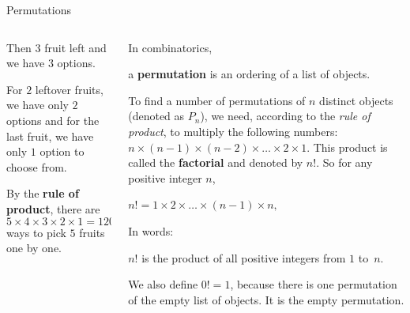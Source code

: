 \documentclass[9pt,aspectratio=169]{beamer}
\begin{document}
\begin{frame}{Permutations}
\begin{columns}[T]
\begin{column}{0.5\textwidth}
      Then $3$ fruit left and we have $3$ options. 
      
      For $2$ leftover fruits, we have only $2$ options and for the last fruit, we have only $1$ option to choose from.

      By the \textbf{rule of product}, there are
      \[5 \times 4 \times 3 \times 2 \times 1 = 120\]
      ways to pick $5$ fruits one by one. 
    \end{column}
    \begin{column}{0.5\textwidth}
      In combinatorics, 
      \begin{definition}
        a \textbf{permutation} is an ordering of a list of objects.
      \end{definition}
      To find a number of permutations of $n$ distinct objects (denoted as $P_n$), we need, according to the \emph{rule of product}, to multiply the following numbers: $n \times (n − 1) \times (n − 2) \times \ldots \times 2 \times 1$.
      This product is called the \textbf{factorial} and denoted by $n!$. So for any positive integer $n$,
      \begin{definition}
        \centering $n! = 1 \times 2 \times \ldots \times (n − 1) \times n,$
      \end{definition} 
      In words:
      \begin{example}
        $n!$ is the product of all positive integers from $1$ to~$n$.
      \end{example}

      We also define $0! = 1$, because there is one permutation of the empty list of objects. It is the empty permutation. 
    \end{column}
  \end{columns}
\end{frame}
\end{document}
